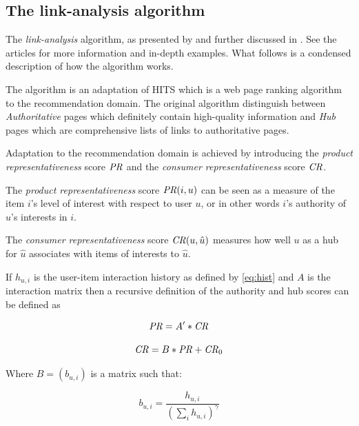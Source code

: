 \subsection{The link-analysis algorithm}\label{sec:background:theory:linkanalysis}


The \textit{link-analysis} algorithm, as presented by \cite{huang2004link} and further discussed in \cite{huang2007comparison}.  See the articles for more information and in-depth examples. What follows is a condensed description of how the algorithm works.

The algorithm is an adaptation of HITS \cite{kleinberg1999authoritative} which is a web page ranking algorithm to the recommendation domain. The original algorithm distinguish between \textit{Authoritative} pages which definitely contain high-quality information and \textit{Hub} pages which are comprehensive lists of links to authoritative pages. \citep{huang2007comparison}

Adaptation to the recommendation domain is achieved by introducing the \textit{product representativeness} score $\mathit{PR}$ and the \textit{consumer representativeness} score $\mathit{CR}$.

The \textit{product representativeness} score $\mathit{PR}(i, u)$ can be seen as a measure of the item $i$'s level of interest with respect to user $u$, or in other words $i$'s authority of $u$'s interests in $i$.

The \textit{consumer representativeness} score $\mathit{CR}(u, \hat{u})$ measures how well $u$ as a hub for $\hat{u}$ associates with items of interests to $\hat{u}$.

If $h_{u, i}$ is the user-item interaction history as defined by \ref{eq:hist} and $A$ is the interaction matrix then a recursive definition of the authority and hub scores can be defined as

\begin{equation}
    \mathit{PR} = A' * \mathit{CR}
\end{equation}

\begin{equation}
    \mathit{CR} = B * \mathit{PR} + \mathit{CR}_0
\end{equation}

Where $B = (b_{u, i})$ is a matrix such that:

\begin{equation}
    b_{u, i} = \frac{ h_{u, i} }{ \left(\sum_{i} h_{u, i}\right)^\gamma }
\end{equation}

